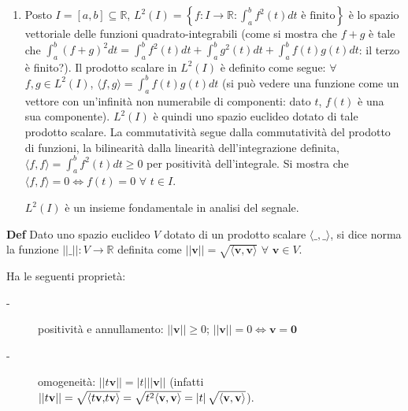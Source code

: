 \documentclass{article}
\begin{document}
\begin{enumerate}
\item Posto $I=\left[ a,b\right] \subseteq 
\mathbb{R}
$, $L^{2}\left( I\right) =\left\{ f:I\rightarrow 
\mathbb{R}
:\int_{a}^{b}f^{2}\left( t\right) dt\text{ \`{e} finito}\right\} $ \`{e} lo
spazio vettoriale delle funzioni quadrato-integrabili (come si mostra che $%
f+g$ \`{e} tale che $\int_{a}^{b}\left( f+g\right)
^{2}dt=\int_{a}^{b}f^{2}\left( t\right) dt+\int_{a}^{b}g^{2}\left( t\right)
dt+\int_{a}^{b}f\left( t\right) g\left( t\right) dt$: il terzo \`{e}
finito?). Il prodotto scalare in $L^{2}\left( I\right) $ \`{e} definito come
segue: $\forall $ $f,g\in L^{2}\left( I\right) $, $\langle f,g\rangle
=\int_{a}^{b}f\left( t\right) g\left( t\right) dt$ (si pu\`{o} vedere una
funzione come un vettore con un'infinit\`{a} non numerabile di componenti:
dato $t$, $f\left( t\right) $ \`{e} una sua componente). $L^{2}\left(
I\right) $ \`{e} quindi uno spazio euclideo dotato di tale prodotto scalare.
La commutativit\`{a} segue dalla commutativit\`{a} del prodotto di funzioni,
la bilinearit\`{a} dalla linearit\`{a} dell'integrazione definita, $\langle
f,f\rangle =\int_{a}^{b}f^{2}\left( t\right) dt\geq 0$ per positivit\`{a}
dell'integrale. Si mostra che $\langle f,f\rangle =0\Longleftrightarrow
f\left( t\right) =0$ $\forall $ $t\in I$.

$L^{2}\left( I\right) $ \`{e} un insieme fondamentale in analisi del segnale.
\end{enumerate}

\textbf{Def} Dato uno spazio euclideo $V$ dotato di un prodotto scalare $%
\langle \_,\_\rangle $, si dice norma la funzione $\left\vert \left\vert
\_\right\vert \right\vert :V\rightarrow 
\mathbb{R}
$ definita come $\left\vert \left\vert \mathbf{v}\right\vert \right\vert =%
\sqrt{\langle \mathbf{v,v}\rangle }$ $\forall $ $\mathbf{v}\in V$.

Ha le seguenti propriet\`{a}:

\begin{description}
\item[-] positivit\`{a} e annullamento: $\left\vert \left\vert \mathbf{v}%
\right\vert \right\vert \geq 0$; $\left\vert \left\vert \mathbf{v}%
\right\vert \right\vert =0\Longleftrightarrow \mathbf{v=0}$

\item[-] omogeneit\`{a}: $\left\vert \left\vert t\mathbf{v}\right\vert
\right\vert =\left\vert t\right\vert \left\vert \left\vert \mathbf{v}%
\right\vert \right\vert $ (infatti $\left\vert \left\vert t\mathbf{v}%
\right\vert \right\vert =\sqrt{\langle t\mathbf{v,}t\mathbf{v}\rangle }=%
\sqrt{t^{2}\langle \mathbf{v,v}\rangle }=\left\vert t\right\vert \sqrt{%
\langle \mathbf{v,v}\rangle }$).
\end{description}
\end{document}
